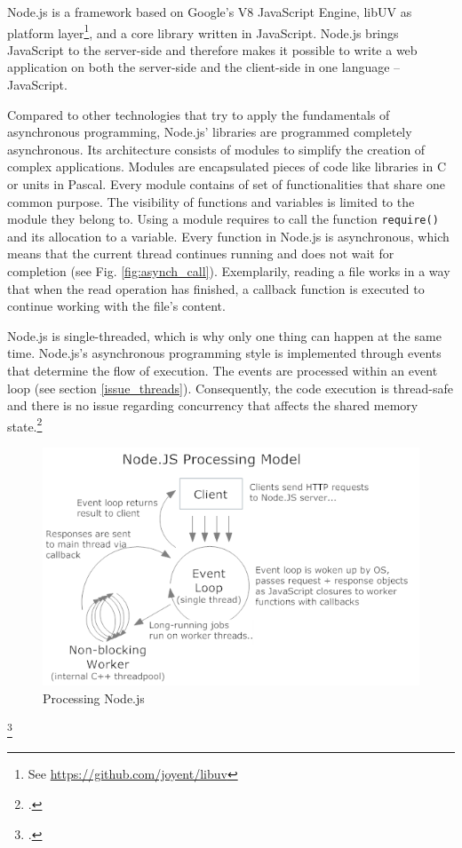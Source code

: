 Node.js is a framework based on Google's V8 JavaScript Engine, libUV as platform
layer\footnote{See \url{https://github.com/joyent/libuv}}, and a core library
written in JavaScript.
Node.js brings JavaScript to the server-side and therefore makes it possible to
write a web application on both the server-side and the client-side in one
language – JavaScript.

Compared to other technologies that try to apply the fundamentals of
asynchronous programming, Node.js' libraries are programmed completely
asynchronous. Its architecture consists of modules to simplify the creation of
complex applications. Modules are encapsulated pieces of code like libraries in
C or units in Pascal. Every module contains of set of functionalities that share
one common purpose. The visibility of functions and variables is limited to the
module they belong to. Using a module requires to call the function \texttt{require()}
and its allocation to a variable.
Every function in Node.js is asynchronous, which means that the current thread
continues running and does not wait for completion (see Fig.
\ref{fig:asynch_call}). Exemplarily, reading a file works in a way that when the
read operation has finished, a callback function is executed to continue working
with the file's content.

Node.js is single-threaded, which is why only one thing can happen at the same
time. Node.js's asynchronous programming style is implemented through events
that determine the flow of execution. The events are processed within an event
loop (see section \ref{issue_threads}). Consequently, the code execution is
thread-safe and there is no issue regarding concurrency that affects the shared
memory state.\footcite[Cf.][p.16]{teixeira_2012}

\begin{figure}[hbtp]
\centering
\includegraphics[width=\textwidth]{img/processing_model.png}
\caption[Processing Node.js]{Processing Node.js\footnotemark}
\label{fig:processing_model}
\end{figure}
\footcitetext{aaronstannard_2011}

